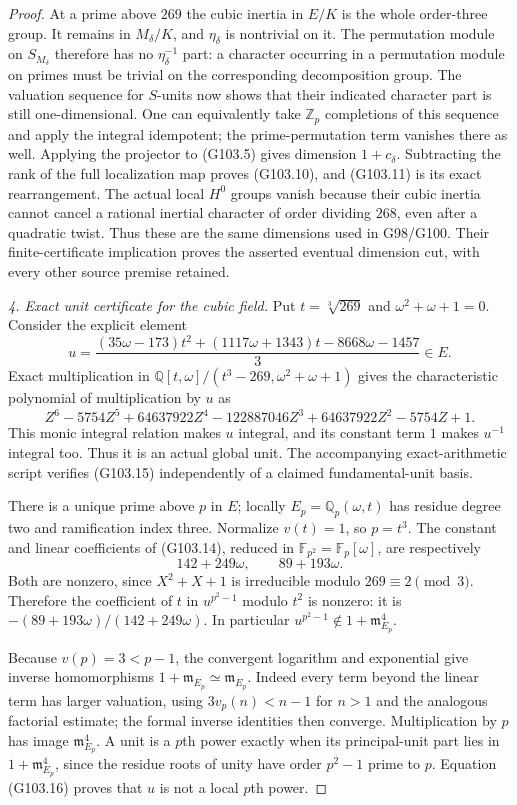 \begin{proof}
At a prime above $269$ the cubic inertia in $E/K$ is the whole
order-three group.  It remains in $M_\delta/K$, and
$\eta_\delta$ is nontrivial on it.
The permutation module on $S_{M_\delta}$ therefore has no
$\eta_\delta^{-1}$ part: a character occurring in a permutation
module on primes must be trivial on the corresponding
decomposition group.  The valuation sequence for $S$-units now
shows that their indicated character part is still
one-dimensional.  One can equivalently take $\mathbb Z_p$
completions of this sequence and apply the integral idempotent;
the prime-permutation term vanishes there as well.
Applying the projector to (G103.5) gives dimension
$1+c_\delta$.  Subtracting the rank of the full localization
map proves (G103.10), and (G103.11) is its exact rearrangement.
The actual local $H^0$ groups vanish because their cubic inertia
cannot cancel a rational inertial character of order dividing
$268$, even after a quadratic twist.
Thus these are the same dimensions used in G98/G100.
Their finite-certificate implication proves the asserted
eventual dimension cut, with every other source premise retained.

\emph{4. Exact unit certificate for the cubic field.}
Put $t=\sqrt[3]{269}$ and $\omega^2+\omega+1=0$.
Consider the explicit element
\[
 u=\frac{(35\omega-173)t^2+(1117\omega+1343)t
                    -8668\omega-1457}{3}\in E.
 \tag{G103.14}
\]
Exact multiplication in
$\mathbb Q[t,\omega]/(t^3-269,\omega^2+\omega+1)$ gives the
characteristic polynomial of multiplication by $u$ as
\[
 Z^6-5754Z^5+64637922Z^4-122887046Z^3
                 +64637922Z^2-5754Z+1.
 \tag{G103.15}
\]
This monic integral relation makes $u$ integral, and its constant
term $1$ makes $u^{-1}$ integral too.  Thus it is an actual
global unit.  The accompanying exact-arithmetic script verifies
(G103.15) independently of a claimed fundamental-unit basis.

There is a unique prime above $p$ in $E$; locally
$E_p=\mathbb Q_p(\omega,t)$ has residue degree two and
ramification index three.  Normalize $v(t)=1$, so $p=t^3$.
The constant and linear coefficients of (G103.14), reduced in
$\mathbb F_{p^2}=\mathbb F_p[\omega]$, are respectively
\[
                         142+249\omega,\qquad89+193\omega.
 \tag{G103.16}
\]
Both are nonzero, since $X^2+X+1$ is irreducible modulo
$269\equiv2\pmod3$.
Therefore the coefficient of $t$ in $u^{p^2-1}$ modulo
$t^2$ is nonzero: it is
$- (89+193\omega)/(142+249\omega)$.
In particular $u^{p^2-1}\notin1+\mathfrak m_{E_p}^4$.

Because $v(p)=3<p-1$, the convergent logarithm and exponential
give inverse homomorphisms
$1+\mathfrak m_{E_p}\simeq\mathfrak m_{E_p}$.
Indeed every term beyond the linear term has larger valuation,
using $3v_p(n)<n-1$ for $n>1$ and the analogous factorial
estimate; the formal inverse identities then converge.
Multiplication by $p$ has image $\mathfrak m_{E_p}^4$.
A unit is a $p$th power exactly when its principal-unit part
lies in $1+\mathfrak m_{E_p}^4$, since the residue roots of
unity have order $p^2-1$ prime to $p$.
Equation (G103.16) proves that $u$ is not a local $p$th power.


\end{proof}
